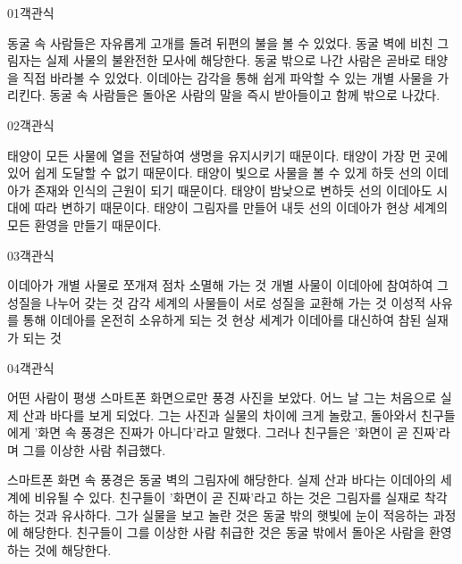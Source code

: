 \documentclass[fs85,seriesWit]{korfarm-base}
\begin{document}
\kfBeginMC
\begin{kfQBlock}{01}{객관식}
\begin{kfChoices}
\kfChoice 동굴 속 사람들은 자유롭게 고개를 돌려 뒤편의 불을 볼 수 있었다.
\kfChoice 동굴 벽에 비친 그림자는 실제 사물의 불완전한 모사에 해당한다.
\kfChoice 동굴 밖으로 나간 사람은 곧바로 태양을 직접 바라볼 수 있었다.
\kfChoice 이데아는 감각을 통해 쉽게 파악할 수 있는 개별 사물을 가리킨다.
\kfChoice 동굴 속 사람들은 돌아온 사람의 말을 즉시 받아들이고 함께 밖으로 나갔다.
\end{kfChoices}
\end{kfQBlock}

\begin{kfQBlock}{02}{객관식}
\begin{kfChoices}
\kfChoice 태양이 모든 사물에 열을 전달하여 생명을 유지시키기 때문이다.
\kfChoice 태양이 가장 먼 곳에 있어 쉽게 도달할 수 없기 때문이다.
\kfChoice 태양이 빛으로 사물을 볼 수 있게 하듯 선의 이데아가 존재와 인식의 근원이 되기 때문이다.
\kfChoice 태양이 밤낮으로 변하듯 선의 이데아도 시대에 따라 변하기 때문이다.
\kfChoice 태양이 그림자를 만들어 내듯 선의 이데아가 현상 세계의 모든 환영을 만들기 때문이다.
\end{kfChoices}
\end{kfQBlock}

\begin{kfQBlock}{03}{객관식}
\begin{kfChoices}
\kfChoice 이데아가 개별 사물로 쪼개져 점차 소멸해 가는 것
\kfChoice 개별 사물이 이데아에 참여하여 그 성질을 나누어 갖는 것
\kfChoice 감각 세계의 사물들이 서로 성질을 교환해 가는 것
\kfChoice 이성적 사유를 통해 이데아를 온전히 소유하게 되는 것
\kfChoice 현상 세계가 이데아를 대신하여 참된 실재가 되는 것
\end{kfChoices}
\end{kfQBlock}

\begin{kfQBlock}{04}{객관식}
\begin{kfEvidence}어떤 사람이 평생 스마트폰 화면으로만 풍경 사진을 보았다. 어느 날 그는 처음으로 실제 산과 바다를 보게 되었다. 그는 사진과 실물의 차이에 크게 놀랐고, 돌아와서 친구들에게 '화면 속 풍경은 진짜가 아니다'라고 말했다. 그러나 친구들은 '화면이 곧 진짜'라며 그를 이상한 사람 취급했다.\end{kfEvidence}
\begin{kfChoices}
\kfChoice 스마트폰 화면 속 풍경은 동굴 벽의 그림자에 해당한다.
\kfChoice 실제 산과 바다는 이데아의 세계에 비유될 수 있다.
\kfChoice 친구들이 '화면이 곧 진짜'라고 하는 것은 그림자를 실재로 착각하는 것과 유사하다.
\kfChoice 그가 실물을 보고 놀란 것은 동굴 밖의 햇빛에 눈이 적응하는 과정에 해당한다.
\kfChoice 친구들이 그를 이상한 사람 취급한 것은 동굴 밖에서 돌아온 사람을 환영하는 것에 해당한다.
\end{kfChoices}
\end{kfQBlock}
\end{document}
